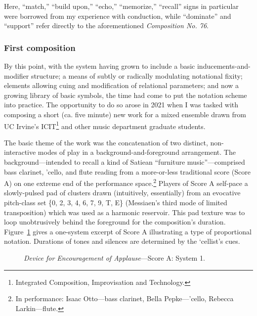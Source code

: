     \noindent Here, ``match,'' ``build upon,'' ``echo,'' ``memorize,'' ``recall'' signs in particular were borrowed from my experience with conduction, while ``dominate'' and ``support'' refer directly to the aforementioned \textit{Composition No. 76}.


    \subsubsection{First composition}

    By this point, with the system having grown to include a basic inducements-and-modifier structure; a means of subtly or radically modulating notational fixity; elements allowing cuing and modification of relational parameters; and now a growing library of basic symbols, the time had come to put the notation scheme into practice. The opportunity to do so arose in 2021 when I was tasked with composing a short (ca. five minute) new work for a mixed ensemble drawn from UC Irvine's ICIT\footnote{Integrated Composition, Improvisation and Technology.} and other music department graduate students.

    The basic theme of the work was the concatenation of two distinct, non-interactive modes of play in a background-and-foreground arrangement. The background---intended to recall a kind of Satiean ``furniture music''---comprised bass clarinet, 'cello, and flute reading from a more-or-less traditional score (Score A) on one extreme end of the performance space.\footnote{In performance: Isaac Otto---bass clarinet, Bella Pepke---'cello, Rebecca Larkin---flute.} Players of Score A self-pace a slowly-pulsed pad of clusters drawn (intuitively, essentially) from an evocative pitch-class set \{0, 2, 3, 4, 6, 7, 9, T, E\} (Messiaen's third mode of limited transposition) which was used as a harmonic reservoir. This pad texture was to loop unobtrusively behind the foreground for the composition's duration. Figure~\ref{fig:encouragementA} gives a one-system excerpt of Score A illustrating a type of proportional notation. Durations of tones and silences are determined by the `cellist's cues.

    \begin{figure}
        \centering
        \captionsetup{width=.5\textwidth}
        \caption{\textit{Device for Encouragement of Applause}---Score A: System 1.}
        \label{fig:encouragementA}
    \end{figure}
    
